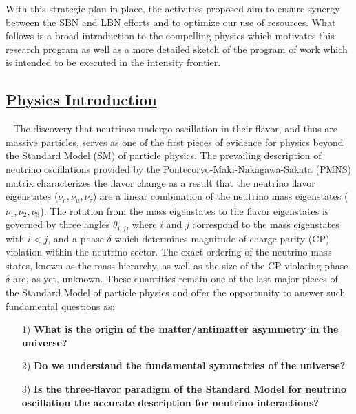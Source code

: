 With this strategic plan in place, the activities proposed aim to ensure synergy between the SBN and LBN efforts and to optimize our use of resources. What follows is a broad introduction to the compelling physics which motivates this research program as well as a more detailed sketch of the program of work which is intended to be executed in the intensity frontier.

\subsection*{\underline{Physics Introduction}}~\label{ss:if-physics}
The discovery that neutrinos undergo oscillation in their flavor, and thus are massive particles, serves as one of the first pieces of evidence for physics beyond the Standard Model (SM) of particle physics. The prevailing description of neutrino oscillations provided by the Pontecorvo-Maki-Nakagawa-Sakata (PMNS) matrix characterizes the flavor change as a result that the neutrino flavor eigenstates ($\nu_{e}, \nu_{\mu}, \nu_{\tau}$) are a linear combination of the neutrino mass eigenstates ($\nu_{1}, \nu_{2}, \nu_{3}$). The rotation from the mass eigenstates to the flavor eigenstates is governed by three angles $\theta_{i,j}$, where $i$ and $j$ correspond to the mass eigenstates with $i < j$, and a phase $\delta$ which determines magnitude of charge-parity (CP) violation within the neutrino sector.  The exact ordering of the neutrino mass states, known as the mass hierarchy, as well as the size of the CP-violating phase $\delta$ are, as yet, unknown. These quantities remain one of the last major pieces of the Standard Model of particle physics and offer the opportunity to answer such fundamental questions as:


\begin{itemize}
\item[1)] \textbf{What is the origin of the matter/antimatter asymmetry in the universe?}

\item[2)] \textbf{Do we understand the fundamental symmetries of the universe?}

\item[3)] \textbf{Is the three-flavor paradigm of the Standard Model for neutrino oscillation the accurate description for neutrino interactions?}
\end{itemize}

